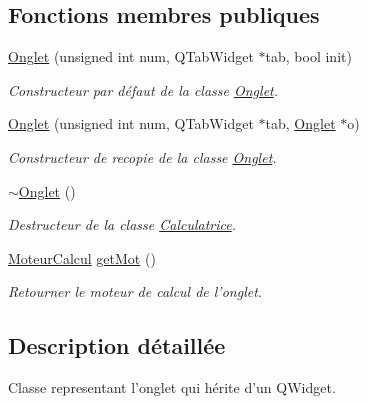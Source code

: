 \subsection*{Fonctions membres publiques}
\begin{DoxyCompactItemize}
\item 
\hyperlink{class_onglet_a0d7cefa46e78a411930d9def60f4267f}{Onglet} (unsigned int num, Q\-Tab\-Widget $\ast$tab, bool init)
\begin{DoxyCompactList}\small\item\em Constructeur par défaut de la classe \hyperlink{class_onglet}{Onglet}. \end{DoxyCompactList}\item 
\hyperlink{class_onglet_aa5950fca5fadb7343c5e124b1c10f17c}{Onglet} (unsigned int num, Q\-Tab\-Widget $\ast$tab, \hyperlink{class_onglet}{Onglet} $\ast$o)
\begin{DoxyCompactList}\small\item\em Constructeur de recopie de la classe \hyperlink{class_onglet}{Onglet}. \end{DoxyCompactList}\item 
\hypertarget{class_onglet_a717d9bd0139081b4e779f552c835b0f5}{\hyperlink{class_onglet_a717d9bd0139081b4e779f552c835b0f5}{$\sim$\-Onglet} ()}\label{class_onglet_a717d9bd0139081b4e779f552c835b0f5}

\begin{DoxyCompactList}\small\item\em Destructeur de la classe \hyperlink{class_calculatrice}{Calculatrice}. \end{DoxyCompactList}\item 
\hyperlink{classcalcul_1_1_moteur_calcul}{Moteur\-Calcul} \hyperlink{class_onglet_ab534cdcfcdd5a02d0f872e1fcbc8df58}{get\-Mot} ()
\begin{DoxyCompactList}\small\item\em Retourner le moteur de calcul de l'onglet. \end{DoxyCompactList}\end{DoxyCompactItemize}


\subsection{Description détaillée}
Classe representant l'onglet qui hérite d'un Q\-Widget. 

